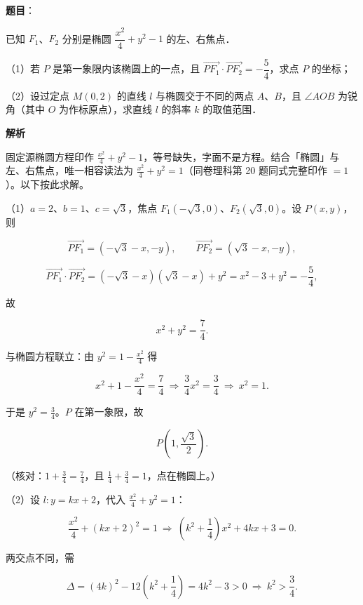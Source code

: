 \begin{answer}

\textbf{题目}：

已知 $F_1$、$F_2$ 分别是椭圆 $\dfrac{x^2}{4}+y^2-1$ 的左、右焦点．

（1）若 $P$ 是第一象限内该椭圆上的一点，且 $\overrightarrow{PF_1}\cdot\overrightarrow{PF_2}=-\dfrac54$，求点 $P$ 的坐标；

（2）设过定点 $M(0,2)$ 的直线 $l$ 与椭圆交于不同的两点 $A$、$B$，且 $\angle AOB$ 为锐角（其中 $O$ 为作标原点），求直线 $l$ 的斜率 $k$ 的取值范围．

\textbf{解析}

\begin{gktip}
固定源椭圆方程印作 $\frac{x^2}{4}+y^2-1$，等号缺失，字面不是方程。结合「椭圆」与左、右焦点，唯一相容读法为 $\frac{x^2}{4}+y^2=1$（同卷理科第 20 题同式完整印作 $=1$）。以下按此求解。
\end{gktip}

（1）$a=2$、$b=1$、$c=\sqrt3$，焦点 $F_1(-\sqrt3,0)$、$F_2(\sqrt3,0)$。设 $P(x,y)$，则

\nopagebreak[4]
\[\overrightarrow{PF_1}=(-\sqrt3-x,-y),\qquad \overrightarrow{PF_2}=(\sqrt3-x,-y),\]

\nopagebreak[4]
\[\overrightarrow{PF_1}\cdot\overrightarrow{PF_2}=(-\sqrt3-x)(\sqrt3-x)+y^2=x^2-3+y^2=-\frac54,\]

故

\nopagebreak[4]
\[x^2+y^2=\frac74 .\]

与椭圆方程联立：由 $y^2=1-\frac{x^2}{4}$ 得

\nopagebreak[4]
\[x^2+1-\frac{x^2}{4}=\frac74\ \Longrightarrow\ \frac34x^2=\frac34\ \Longrightarrow\ x^2=1 .\]

于是 $y^2=\frac34$。$P$ 在第一象限，故

\nopagebreak[4]
\[P\left(1,\frac{\sqrt3}{2}\right).\]

（核对：$1+\frac34=\frac74$，且 $\frac14+\frac34=1$，点在椭圆上。）

（2）设 $l:y=kx+2$，代入 $\frac{x^2}{4}+y^2=1$：

\nopagebreak[4]
\[\frac{x^2}{4}+(kx+2)^2=1\ \Longrightarrow\ \left(k^2+\frac14\right)x^2+4kx+3=0 .\]

两交点不同，需

\nopagebreak[4]
\[\Delta=(4k)^2-12\left(k^2+\frac14\right)=4k^2-3>0\ \Longrightarrow\ k^2>\frac34 .\]


\end{answer}
